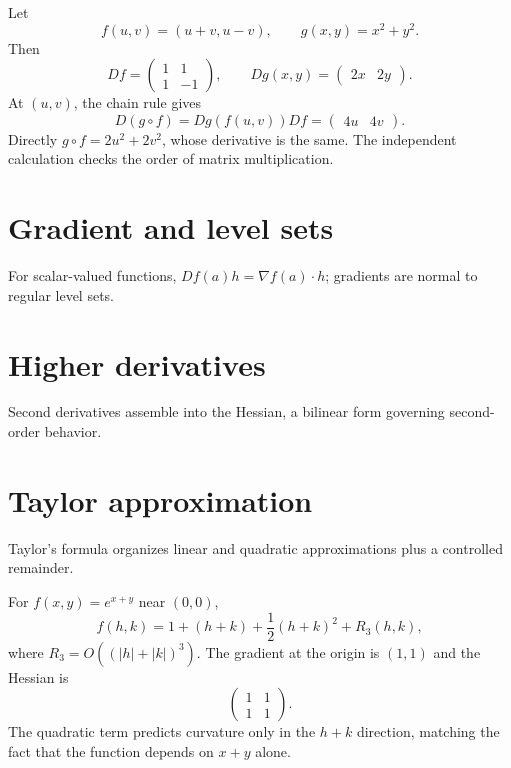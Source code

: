 \begin{example}\label{ex:ii08-expand-02}
Let
\[
f(u,v)=(u+v,u-v),\qquad g(x,y)=x^2+y^2.
\]
Then
\[
Df=\begin{pmatrix}1&1\\1&-1\end{pmatrix},\qquad
Dg(x,y)=\begin{pmatrix}2x&2y\end{pmatrix}.
\]
At \((u,v)\), the chain rule gives
\[
D(g\circ f)=Dg(f(u,v))Df
=\begin{pmatrix}4u&4v\end{pmatrix}.
\]
Directly \(g\circ f=2u^2+2v^2\), whose derivative is the same. The independent
calculation checks the order of matrix multiplication.
\end{example}
\section{Gradient and level sets}
For scalar-valued functions, $Df(a)h=\nabla f(a)\cdot h$; gradients are normal to regular level sets.

\section{Higher derivatives}
Second derivatives assemble into the Hessian, a bilinear form governing second-order behavior.

\section{Taylor approximation}
Taylor's formula organizes linear and quadratic approximations plus a controlled remainder.


\begin{example}\label{ex:ii08-expand-03}
For \(f(x,y)=e^{x+y}\) near \((0,0)\),
\[
f(h,k)=1+(h+k)+\frac12(h+k)^2+R_3(h,k),
\]
where \(R_3=O((|h|+|k|)^3)\). The gradient at the origin is \((1,1)\) and the
Hessian is
\[
\begin{pmatrix}1&1\\1&1\end{pmatrix}.
\]
The quadratic term predicts curvature only in the \(h+k\) direction, matching
the fact that the function depends on \(x+y\) alone.
\end{example}
